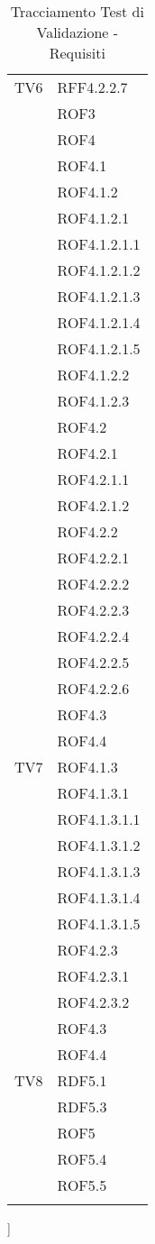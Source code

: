 \begin{center}
\begin{longtable}{|p{7cm}|p{7cm}|}
\midrule
TV6
& RFF4.2.2.7\\
& ROF3\\
& ROF4\\
& ROF4.1\\
& ROF4.1.2\\
& ROF4.1.2.1\\
& ROF4.1.2.1.1\\
& ROF4.1.2.1.2\\
& ROF4.1.2.1.3\\
& ROF4.1.2.1.4\\
& ROF4.1.2.1.5\\
& ROF4.1.2.2\\
& ROF4.1.2.3\\
& ROF4.2\\
& ROF4.2.1\\
& ROF4.2.1.1\\
& ROF4.2.1.2\\
& ROF4.2.2\\
& ROF4.2.2.1\\
& ROF4.2.2.2\\
& ROF4.2.2.3\\
& ROF4.2.2.4\\
& ROF4.2.2.5\\
& ROF4.2.2.6\\
& ROF4.3\\
& ROF4.4\\

\midrule
TV7
& ROF4.1.3\\
& ROF4.1.3.1\\
& ROF4.1.3.1.1\\
& ROF4.1.3.1.2\\
& ROF4.1.3.1.3\\
& ROF4.1.3.1.4\\
& ROF4.1.3.1.5\\
& ROF4.2.3\\
& ROF4.2.3.1\\
& ROF4.2.3.2\\
& ROF4.3\\
& ROF4.4\\

\midrule
TV8
& RDF5.1\\
& RDF5.3\\
& ROF5\\
& ROF5.4\\
& ROF5.5\\

\bottomrule
\caption{Tracciamento Test di Validazione - Requisiti}
\end{longtable}
\end{center}
]

